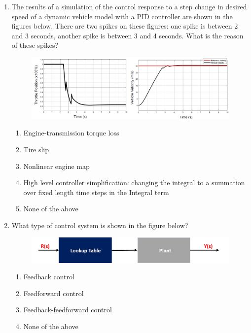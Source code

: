 \begin{enumerate}
\item The results of a simulation of the control response to a step change in desired speed of a dynamic vehicle model with a PID controller are shown in the figures below. 
There are two spikes on these figures: one spike is between 2 and 3 seconds, another spike is between 3 and 4 seconds. What is the reason of these spikes?
\begin{figure}[!htb]
\begin{center}
\includegraphics[scale=0.280]{img/longitudinal_control/image_q11.png}
\end{center}
\label{image_q11}
\end{figure}
	\begin{enumerate}
		\item  Engine-transmission torque loss
		\item Tire slip
		\item Nonlinear engine map
		\item High level controller simplification: changing the integral to a summation over fixed length time steps in the Integral term
		\item None of the above
	\end{enumerate}
\item What type of control system is shown in the figure below?
\begin{figure}[!htb]
\begin{center}
\includegraphics[scale=0.280]{img/longitudinal_control/Openloop.png}
\end{center}
\label{Openloop}
\end{figure}
	\begin{enumerate}
		\item  Feedback control
		\item Feedforward control
		\item Feedback-feedforward control
		\item None of the above

\end{enumerate}
\end{enumerate}
